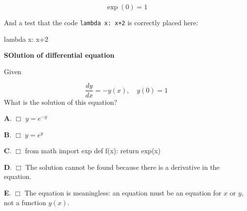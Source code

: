 \documentclass[%
oneside,                 %
final,                   %
10pt]{article}
\newenvironment{doconcequiz}{}{}
\newcounter{doconcequizcounter}
\newenvironment{doconceexercise}{}{}
\newcounter{doconceexercisecounter}
\theoremstyle{definition}
\begin{document}
\begin{enumerate}
\begin{doconceexercise}
\[ \exp{(0)} = 1 \]

And a test that the code \texttt{lambda x: x+2} is correctly placed here:

\bccq
lambda x: x+2
\eccq

\end{doconceexercise}

\begin{doconceexercise}

                             
\label{sec:this:exer:de}


\begin{doconcequiz}
\label{quiz:diff:eq1}


\noindent\textbf{\large SOlution of differential equation}

\noindent
Given

\[ \frac{dy}{dx} = -y(x),\quad y(0)=1 \]
What is the solution of this equation?

\vspace{2mm}

\textbf{A}. $\Box$ 
$y=e^{-y}$

\textbf{B}. $\Box$ 
$y=e^{y}$

\textbf{C}. $\Box$ 
\bpycod
from math import exp
def f(x):
    return exp(x)
\epycod

\textbf{D}. $\Box$ 
The solution cannot be found because there is a derivative in the equation.

\textbf{E}. $\Box$ 
The equation is meaningless: an equation must be an equation
for $x$ or $y$, not a function $y(x)$.



\vspace{3mm}

\end{doconcequiz}



\end{doconceexercise}

\begin{doconceexercise}

                             


\end{doconceexercise}
\end{enumerate}
\end{document}
